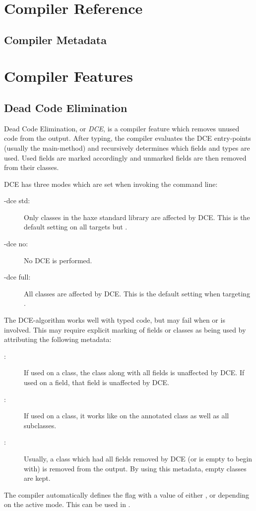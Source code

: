 \documentclass{haxe}
\begin{document}
\chapter{Compiler Reference}
\label{compiler-reference}

\section{Compiler Metadata}
\label{cr-metadata}

\chapter{Compiler Features}
\label{cr-features}

\section{Dead Code Elimination}
\label{cr-dce}

Dead Code Elimination, or \emph{DCE}, is a compiler feature which removes unused code from the output. After typing, the compiler evaluates the DCE entry-points (usually the main-method) and recursively determines which fields and types are used. Used fields are marked accordingly and unmarked fields are then removed from their classes.

DCE has three modes which are set when invoking the command line:

\begin{description}
	\item[-dce std:] Only classes in the haxe standard library are affected by DCE. This is the default setting on all targets but .
	\item[-dce no:] No DCE is performed.
	\item[-dce full:] All classes are affected by DCE. This is the default setting when targeting .
\end{description}
The DCE-algorithm works well with typed code, but may fail when  or  is involved. This may require explicit marking of fields or classes as being used by attributing the following metadata:

\begin{description}
	\item[:] If used on a class, the class along with all fields is unaffected by DCE. If used on a field, that field is unaffected by DCE.
	\item[:] If used on a class, it works like  on the annotated class as well as all subclasses.
	\item[:] Usually, a class which had all fields removed by DCE (or is empty to begin with) is removed from the output. By using this metadata, empty classes are kept.
\end{description}
The compiler automatically defines the flag  with a value of either ,  or  depending on the active mode. This can be used in .
\end{document}
